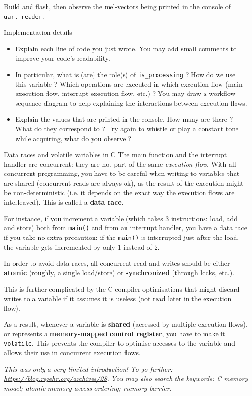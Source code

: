 Build and flash, then observe the mel-vectors being printed in the console of \texttt{uart-reader}.

\begin{bclogo}[couleur = gray!20, arrondi = 0.2, logo=\bcquestion]{Implementation details}
\begin{itemize}
    \item Explain each line of code you just wrote. You may add small comments to improve your code's readability.
    \item In particular, what is (are) the role(s) of \texttt{is\_processing} ? How do we use this variable ? Which operations are executed in which execution flow (main execution flow, interrupt execution flow, etc.) ? You may draw a workflow sequence diagram to help explaining the interactions between execution flows.
    \item Explain the values that are printed in the console. How many are there ? What do they correspond to ? Try again to whistle or play a constant tone while acquiring, what do you observe ?
\end{itemize}
\end{bclogo}

\begin{bclogo}[couleur = gray!20, arrondi = 0.2, logo=\bcinfo]{Data races and volatile variables in C}
The main function and the interrupt handler are concurrent: they are not part of the same \textit{execution flow}.
With all concurrent programming, you have to be careful when writing to variables that are shared (concurrent reads are always ok), as the result of the execution might be non-deterministic (i.e. it depends on the exact way the execution flows are interleaved). This is called a \textbf{data race}.

For instance, if you increment a variable (which takes 3 instructions: load, add and store) both from \texttt{main()} and from an interrupt handler, you have a data race if you take no extra precaution: if the \texttt{main()} is interrupted just after the load, the variable gets incremented by only 1 instead of 2.

In order to avoid data races, all concurrent read and writes should be either \textbf{atomic} (roughly, a single load/store) or \textbf{synchronized} (through locks, etc.).

This is further complicated by the C compiler optimisations that might discard writes to a variable if it assumes it is useless (not read later in the execution flow).

As a result, whenever a variable is \textbf{shared} (accessed by multiple execution flows), or represents a \textbf{memory-mapped control register}, you have to make it \texttt{volatile}. This prevents the compiler to optimise accesses to the variable and allows their use in concurrent execution flows.

\textit{This was only a very limited introduction! To go further: \url{https://blog.regehr.org/archives/28}. You may also search the keywords: C memory model; atomic memory access ordering; memory barrier.}
\end{bclogo}

